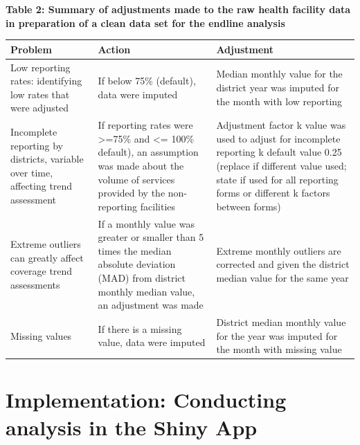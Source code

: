 \documentclass[
  english,
  letterpaper,
  DIV=11,
  numbers=noendperiod]{scrreprt}
\begin{document}
\textbf{Table 2: Summary of adjustments made to the raw health facility
data in preparation of a clean data set for the endline analysis}

\begin{longtable}[]{@{}
  >{\raggedright\arraybackslash}p{}
  >{\raggedright\arraybackslash}p{}
  >{\raggedright\arraybackslash}p{}@{}}
\toprule\noalign{}
\begin{minipage}[b]{\linewidth}\raggedright
\textbf{Problem}
\end{minipage} & \begin{minipage}[b]{\linewidth}\raggedright
\textbf{Action}
\end{minipage} & \begin{minipage}[b]{\linewidth}\raggedright
\textbf{Adjustment}
\end{minipage} \\
\midrule\noalign{}
\endhead
\bottomrule\noalign{}
\endlastfoot
Low reporting rates: identifying low rates that were adjusted & If below
75\% (default), data were imputed & Median monthly value for the
district year was imputed for the month with low reporting \\
Incomplete reporting by districts, variable over time, affecting trend
assessment & If reporting rates were \textgreater=75\% and \textless=
100\% default), an assumption was made about the volume of services
provided by the non-reporting facilities & Adjustment factor k value was
used to adjust for incomplete reporting k default value 0.25 (replace if
different value used; state if used for all reporting forms or different
k factors between forms) \\
Extreme outliers can greatly affect coverage trend assessments & If a
monthly value was greater or smaller than 5 times the median absolute
deviation (MAD) from district monthly median value, an adjustment was
made & Extreme monthly outliers are corrected and given the district
median value for the same year \\
Missing values & If there is a missing value, data were imputed &
District median monthly value for the year was imputed for the month
with missing value \\
\end{longtable}

\section{Implementation: Conducting analysis in the Shiny
App}\label{sec-dqa-adjust-implement}
\end{document}
